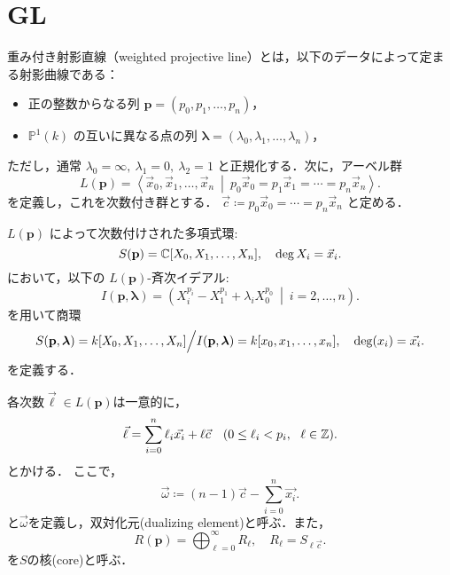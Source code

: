 \section{GL}
\begin{defn}\cite{GL87}
重み付き射影直線（weighted projective line）とは，以下のデータによって定まる射影曲線である：

\begin{itemize}
  \item 正の整数からなる列 $\mathbf{p} = (p_0, p_1, \dots, p_n)$，
  \item $\mathbb{P}^1(k)$ の互いに異なる点の列 $\boldsymbol{\lambda} = (\lambda_0, \lambda_1, \dots, \lambda_n)$，
\end{itemize}

ただし，通常 $\lambda_0 = \infty,\ \lambda_1 = 0,\ \lambda_2 = 1$ と正規化する．次に，アーベル群
\[
L(\mathbf{p}) = \left\langle \vec{x}_0, \vec{x}_1, \dots, \vec{x}_n \ \middle| \ p_0 \vec{x}_0 = p_1 \vec{x}_1 = \cdots = p_n \vec{x}_n \right\rangle .
\]
を定義し，これを次数付き群とする． $\vec{c}\coloneq p_0 \vec{x}_0 = \cdots = p_n \vec{x}_n$ と定める．

$L(\mathbf{p})$ によって次数付けされた多項式環:
\[
	S(\mathbf{p}) = {\mathbb C}[X_0, X_1, \dots, X_n], \quad \deg X_i = \vec{x}_i. 
\]
において，以下の $L(\mathbf{p})$-斉次イデアル:
\[
I(\mathbf{p}, \boldsymbol{\lambda}) = \left( X_i^{p_i} - X_1^{p_1} + \lambda_i X_0^{p_0} \ \middle|\ i = 2, \dots, n \right).
\]
を用いて商環
\[
	S(\mathbf{p}, \boldsymbol{\lambda}) = k[X_0, X_1, \dots, X_n]\Big{/}I(\mathbf{p}, \boldsymbol{\lambda}) = k[x_0,x_1,\ldots, x_n],\quad \deg(x_i)=\vec{x_i}.
\]
を定義する．
\end{defn}


各次数$\vec{\ell}\in L(\mathbf{p})$は一意的に，
\[\vec{\ell} = \sum_{i=0}^n \ell_i\vec{x_i} + \ell\vec{c}\quad (0\le \ell_i < p_i,\ \ \ell \in {\mathbb Z}).\]
とかける．
ここで，
\[\vec{\omega} \coloneq (n-1)\vec{c} - \sum_{i=0}^n\vec{x_i}.\]
と$\vec{\omega}$を定義し，双対化元(dualizing element)と呼ぶ．また，
\[R(\mathbf{p} )= \bigoplus_{\ell=0}^\infty R_{\ell},\quad R_\ell = S_{\ell\vec{c}}.\]
を$S$の核(core)と呼ぶ．

